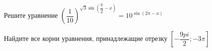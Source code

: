 \begin{ex}
	\begin{condition}
		\begin{enumcols}[label=\asbuk*)]
			\item Решите уравнение \( \left(\dfrac{1}{10}\right)^{\sqrt{3}\sin{\left(\dfrac{\pi}{2} - x\right)}} = 10^{\sin (2\pi - x)} \)
			\item Найдите все корни уравнения, принадлежащие отрезку \( \left[-\dfrac{9pi}{2};-3\pi\right] \)
		\end{enumcols}
	\end{condition}
\end{ex}